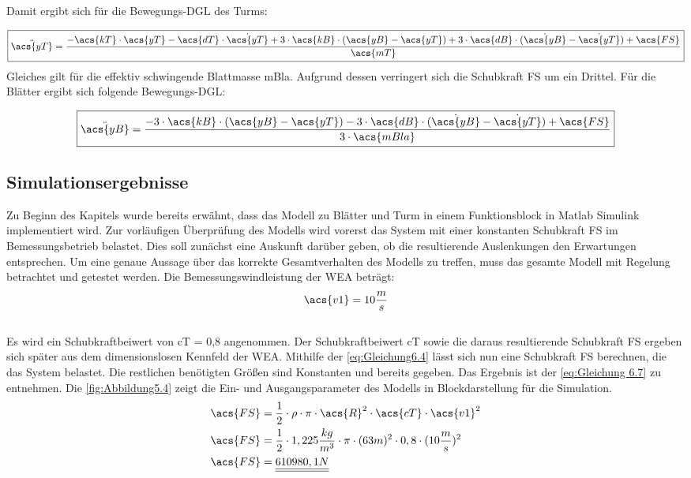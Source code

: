 Damit ergibt sich für die Bewegungs-DGL des Turms:

\begin{align}\label{eq:Gleichung 6.3}
    \boxed{\ddot{\acs{yT}}=\frac{-\acs{kT} \cdot \acs{yT}- \acs{dT} \cdot \dot{\acs{yT}}+ 3 \cdot \acs{kB} \cdot(\acs{yB}-\acs{yT})+ 3\cdot \acs{dB} \cdot (\dot{\acs{yB}}-\dot{\acs{yT}})+\acs{FS}} {\acs{mT}}}
\end{align}
\newline
Gleiches gilt für die effektiv schwingende Blattmasse \acs{mBla}. Aufgrund dessen verringert sich die Schubkraft \acs{FS} um ein Drittel. Für die Blätter ergibt sich folgende Bewegungs-DGL:

\begin{align}\label{eq:Gleichung6.4}
    \boxed{\ddot{\acs{yB}}=\frac{-3 \cdot \acs{kB} \cdot(\acs{yB}-\acs{yT})-3 \cdot \acs{dB} \cdot (\dot{\acs{yB}}-\dot{\acs{yT}})+\acs{FS}} {3\cdot\acs{mBla}}}
\end{align}

\subsection{Simulationsergebnisse}
Zu Beginn des Kapitels wurde bereits erwähnt, dass das Modell zu Blätter und Turm in einem Funktionsblock in Matlab Simulink implementiert wird. Zur vorläufigen Überprüfung des Modells wird vorerst das System mit einer konstanten Schubkraft \acs{FS} im Bemessungsbetrieb belastet. Dies soll zunächst eine Auskunft darüber geben, ob die resultierende Auslenkungen den Erwartungen entsprechen. Um eine genaue Aussage über das korrekte Gesamtverhalten des Modells zu treffen, muss das gesamte Modell mit Regelung betrachtet und getestet werden. 
Die Bemessungswindleistung der WEA beträgt:
\begin{align}
    \acs{v1} = 10 \frac {m}{s}
\end{align}
\\
Es wird ein Schubkraftbeiwert von \acs{cT} = 0,8 angenommen. Der Schubkraftbeiwert \acs{cT} sowie die daraus resultierende Schubkraft \acs{FS} ergeben sich später aus dem dimensionslosen Kennfeld der WEA. Mithilfe der \autoref{eq:Gleichung6.4} lässt sich nun eine Schubkraft \acs{FS} berechnen, die das System belastet. Die restlichen benötigten Größen sind Konstanten und bereits gegeben. Das Ergebnis ist der \autoref{eq:Gleichung 6.7} zu entnehmen. Die \autoref{fig:Abbildung5.4} zeigt die Ein- und Ausgangsparameter des Modells in Blockdarstellung für die Simulation.
\begin{align}
    \acs{FS} &= \frac{1}{2} \cdot \rho \cdot \pi \cdot \acs{R}^2 \cdot \acs{cT} \cdot \acs{v1}^2 \label{eq:Gleichung6.6} \\
    \acs{FS} &= \frac{1}{2} \cdot 1,225 \frac{kg}{m^3} \cdot \pi \cdot (63m)^2 \cdot 0,8 \cdot (10 \frac{m}{s})^2 \nonumber \\
    \acs{FS} &= \underline{\underline{610980,1 N}} \label{eq:Gleichung 6.7}
\end{align}

